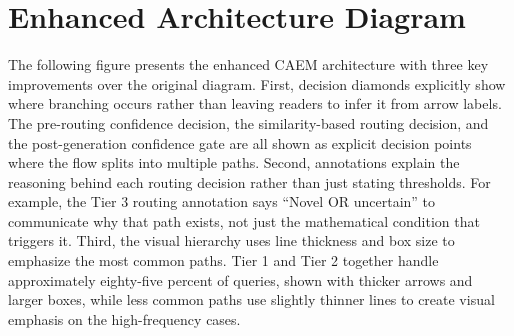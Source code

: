 \documentclass[11pt,a4paper]{article}
\begin{document}
\newpage

\section{Enhanced Architecture Diagram}

The following figure presents the enhanced CAEM architecture with three key improvements over the original diagram. First, decision diamonds explicitly show where branching occurs rather than leaving readers to infer it from arrow labels. The pre-routing confidence decision, the similarity-based routing decision, and the post-generation confidence gate are all shown as explicit decision points where the flow splits into multiple paths. Second, annotations explain the reasoning behind each routing decision rather than just stating thresholds. For example, the Tier 3 routing annotation says ``Novel OR uncertain'' to communicate why that path exists, not just the mathematical condition that triggers it. Third, the visual hierarchy uses line thickness and box size to emphasize the most common paths. Tier 1 and Tier 2 together handle approximately eighty-five percent of queries, shown with thicker arrows and larger boxes, while less common paths use slightly thinner lines to create visual emphasis on the high-frequency cases.
\end{document}
